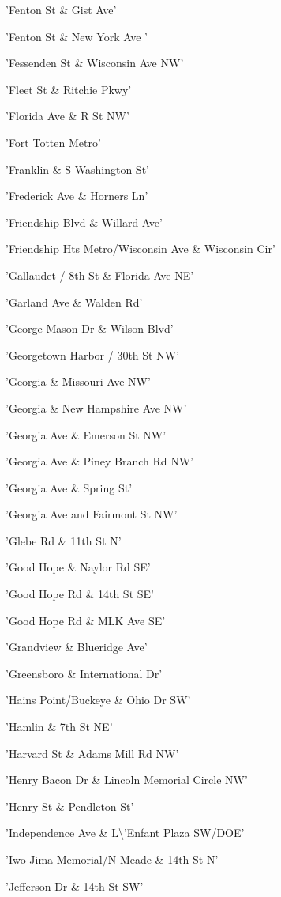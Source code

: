 \documentclass[11pt]{article}
\begin{document}
\begin{enumerate*}
\item 'Fenton St \& Gist Ave'
\item 'Fenton St \& New York Ave '
\item 'Fessenden St \& Wisconsin Ave NW'
\item 'Fleet St \& Ritchie Pkwy'
\item 'Florida Ave \& R St NW'
\item 'Fort Totten Metro'
\item 'Franklin \& S Washington St'
\item 'Frederick Ave \& Horners Ln'
\item 'Friendship Blvd \& Willard Ave'
\item 'Friendship Hts Metro/Wisconsin Ave \& Wisconsin Cir'
\item 'Gallaudet / 8th St \& Florida Ave NE'
\item 'Garland Ave \& Walden Rd'
\item 'George Mason Dr \& Wilson Blvd'
\item 'Georgetown Harbor / 30th St NW'
\item 'Georgia \& Missouri Ave NW'
\item 'Georgia \& New Hampshire Ave NW'
\item 'Georgia Ave \& Emerson St NW'
\item 'Georgia Ave \& Piney Branch Rd NW'
\item 'Georgia Ave \& Spring St'
\item 'Georgia Ave and Fairmont St NW'
\item 'Glebe Rd \& 11th St N'
\item 'Good Hope \& Naylor Rd SE'
\item 'Good Hope Rd \& 14th St SE'
\item 'Good Hope Rd \& MLK Ave SE'
\item 'Grandview \& Blueridge Ave'
\item 'Greensboro \& International Dr'
\item 'Hains Point/Buckeye \& Ohio Dr SW'
\item 'Hamlin \& 7th St NE'
\item 'Harvard St \& Adams Mill Rd NW'
\item 'Henry Bacon Dr \& Lincoln Memorial Circle NW'
\item 'Henry St \& Pendleton St'
\item 'Independence Ave \& L\textbackslash{}'Enfant Plaza SW/DOE'
\item 'Iwo Jima Memorial/N Meade \& 14th St N'
\item 'Jefferson Dr \& 14th St SW'

\end{enumerate*}
\end{document}
